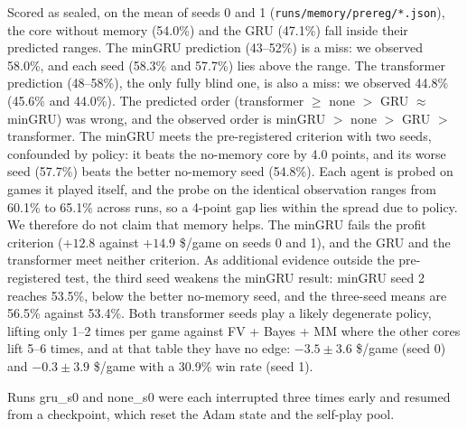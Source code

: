 \documentclass{article}
\newcommand{\file}[1]{{\small\texttt{#1}}}
\begin{document}
Scored as sealed, on the mean of seeds 0 and 1 (\file{runs/memory/prereg/*.json}), the core without memory (54.0\%) and the GRU (47.1\%) fall inside their predicted ranges. The minGRU prediction (43--52\%) is a miss: we observed 58.0\%, and each seed (58.3\% and 57.7\%) lies above the range. The transformer prediction (48--58\%), the only fully blind one, is also a miss: we observed 44.8\% (45.6\% and 44.0\%).
The predicted order (transformer $\geq$ none $>$ GRU $\approx$ minGRU) was wrong, and the observed order is minGRU $>$ none $>$ GRU $>$ transformer.
The minGRU meets the pre-registered criterion with two seeds, confounded by policy: it beats the no-memory core by 4.0 points, and its worse seed (57.7\%) beats the better no-memory seed (54.8\%).
Each agent is probed on games it played itself, and the probe on the identical observation ranges from 60.1\% to 65.1\% across runs, so a 4-point gap lies within the spread due to policy.
We therefore do not claim that memory helps. The minGRU fails the profit criterion ($+12.8$ against $+14.9$ \$/game on seeds 0 and 1), and the GRU and the transformer meet neither criterion.
As additional evidence outside the pre-registered test, the third seed weakens the minGRU result: minGRU seed 2 reaches 53.5\%, below the better no-memory seed, and the three-seed means are 56.5\% against 53.4\%.
Both transformer seeds play a likely degenerate policy, lifting only 1--2 times per game against FV + Bayes + MM where the other cores lift 5--6 times, and at that table they have no edge: $-3.5\pm3.6$ \$/game (seed 0) and $-0.3\pm3.9$ \$/game with a 30.9\% win rate (seed 1).

Runs gru\_s0 and none\_s0 were each interrupted three times early and resumed from a checkpoint, which reset the Adam state and the self-play pool.
\end{document}
